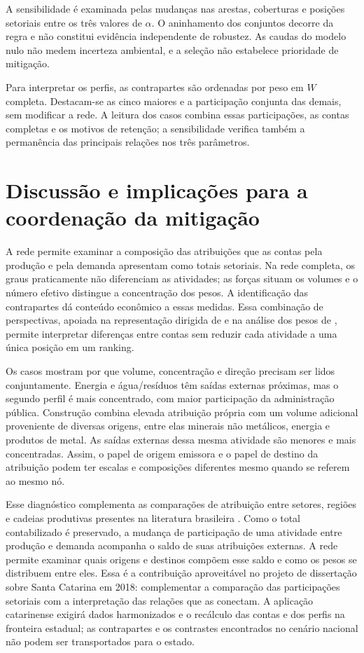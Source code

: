 \documentclass[12pt]{article}
\begin{document}
A sensibilidade é examinada pelas mudanças nas arestas, coberturas e posições setoriais entre os três valores de $\alpha$. O aninhamento dos conjuntos decorre da regra e não constitui evidência independente de robustez. As caudas do modelo nulo não medem incerteza ambiental, e a seleção não estabelece prioridade de mitigação.

Para interpretar os perfis, as contrapartes são ordenadas por peso em $W$ completa. Destacam-se as cinco maiores e a participação conjunta das demais, sem modificar a rede. A leitura dos casos combina essas participações, as contas completas e os motivos de retenção; a sensibilidade verifica também a permanência das principais relações nos três parâmetros.


\section{Discussão e implicações para a coordenação da mitigação}

A rede permite examinar a composição das atribuições que as contas pela produção e pela demanda apresentam como totais setoriais. Na rede completa, os graus praticamente não diferenciam as atividades; as forças situam os volumes e o número efetivo distingue a concentração dos pesos. A identificação das contrapartes dá conteúdo econômico a essas medidas. Essa combinação de perspectivas, apoiada na representação dirigida de \textcite{huang2019} e na análise dos pesos de \textcite{serrano2009}, permite interpretar diferenças entre contas sem reduzir cada atividade a uma única posição em um ranking.

Os casos mostram por que volume, concentração e direção precisam ser lidos conjuntamente. Energia e água/resíduos têm saídas externas próximas, mas o segundo perfil é mais concentrado, com maior participação da administração pública. Construção combina elevada atribuição própria com um volume adicional proveniente de diversas origens, entre elas minerais não metálicos, energia e produtos de metal. As saídas externas dessa mesma atividade são menores e mais concentradas. Assim, o papel de origem emissora e o papel de destino da atribuição podem ter escalas e composições diferentes mesmo quando se referem ao mesmo nó.

Esse diagnóstico complementa as comparações de atribuição entre setores, regiões e cadeias produtivas presentes na literatura brasileira \parencite{imori2015,sanguinetAzzoni2024,montoyaEtAl2026}. Como o total contabilizado é preservado, a mudança de participação de uma atividade entre produção e demanda acompanha o saldo de suas atribuições externas. A rede permite examinar quais origens e destinos compõem esse saldo e como os pesos se distribuem entre eles. Essa é a contribuição aproveitável no projeto de dissertação sobre Santa Catarina em 2018: complementar a comparação das participações setoriais com a interpretação das relações que as conectam. A aplicação catarinense exigirá dados harmonizados e o recálculo das contas e dos perfis na fronteira estadual; as contrapartes e os contrastes encontrados no cenário nacional não podem ser transportados para o estado.
\end{document}
